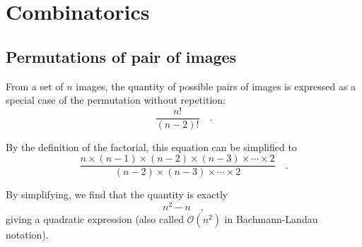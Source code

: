 \chapter{Combinatorics}

\section{Permutations of pair of images}
\label{anx:permutations}

From a set of $n$ images, the quantity of possible pairs of images is expressed as a special case of the permutation without repetition:
\begin{equation}
\frac{n!}{\left( n - 2 \right)!} \quad.
\end{equation}

By the definition of the factorial, this equation can be simplified to
\begin{equation}
\frac{n \times (n-1) \times (n-2) \times (n-3) \times \cdots \times 2}{(n-2) \times (n-3) \times \cdots \times 2} \quad.
\end{equation}

By simplifying, we find that the quantity is exactly
\begin{equation}
n^2 - n\quad,
\end{equation}
giving a quadratic expression (also called $\mathcal{O}(n^2)$ in Bachmann-Landau notation).